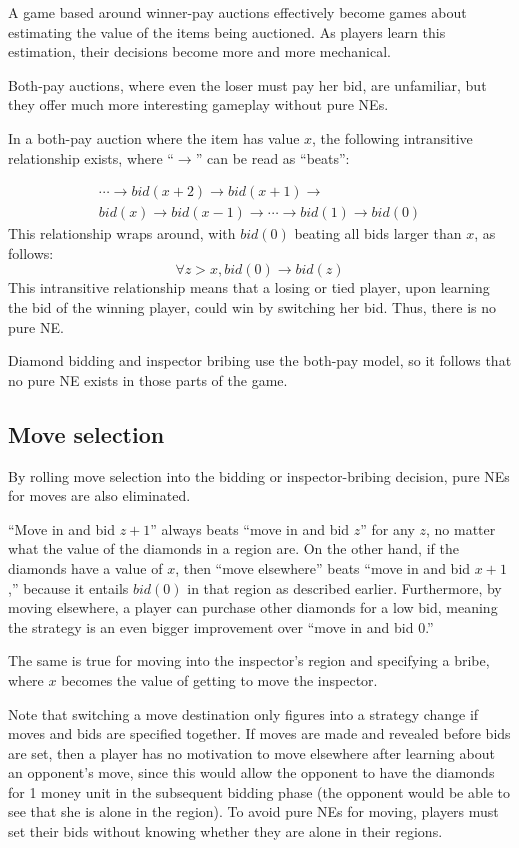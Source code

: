 A game based around winner-pay auctions effectively become games about estimating the value of the items being auctioned.  As players learn this estimation, their decisions become more and more mechanical.

Both-pay auctions, where even the loser must pay her bid, are unfamiliar, but they offer much more interesting gameplay without pure NEs.

In a both-pay auction where the item has value $x$, the following intransitive relationship exists, where ``$\longrightarrow$'' can be read as ``beats'':

\[ 
\begin{array}{l}
\cdots \longrightarrow bid(x+2) \longrightarrow bid(x+1) \longrightarrow \\ 
bid(x) \longrightarrow bid(x-1) \longrightarrow \cdots \longrightarrow bid(1) \longrightarrow bid(0)
\end{array}
\]
This relationship wraps around, with $bid(0)$ beating all bids larger than $x$, as follows:
\[ \forall z>x, bid(0) \longrightarrow bid(z) \]
This intransitive relationship means that a losing or tied player, upon learning the bid of the winning player, could win by switching her bid.  Thus, there is no pure NE.

Diamond bidding and inspector bribing use the both-pay model, so it follows that no pure NE exists in those parts of the game.

\subsection{Move selection}
By rolling move selection into the bidding or inspector-bribing decision, pure NEs for moves are also eliminated.  

``Move in and bid $z+1$'' always beats ``move in and bid $z$'' for any $z$, no matter what the value of the diamonds in a region are. On the other hand, if the diamonds have a value of $x$, then ``move elsewhere'' beats ``move in and bid $x+1$,'' because it entails $bid(0)$ in that region as described earlier.  Furthermore, by moving elsewhere, a player can purchase other diamonds for a low bid, meaning the strategy is an even bigger improvement over ``move in and bid 0.''

The same is true for moving into the inspector's region and specifying a bribe, where $x$ becomes the value of getting to move the inspector.

Note that switching a move destination only figures into a strategy change if moves and bids are specified together.  If moves are made and revealed before bids are set, then a player has no motivation to move elsewhere after learning about an opponent's move, since this would allow the opponent to have the diamonds for 1 money unit in the subsequent bidding phase (the opponent would be able to see that she is alone in the region).  To avoid pure NEs for moving, players must set their bids without knowing whether they are alone in their regions.

